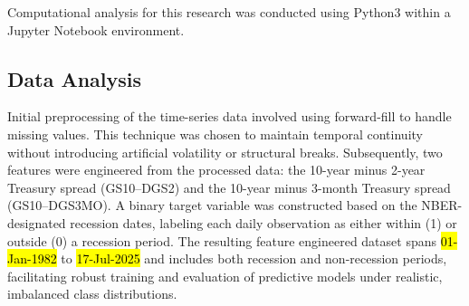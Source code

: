 Computational analysis for this research was conducted using Python3 within a Jupyter Notebook environment.

\subsection{Data Analysis}

Initial preprocessing of the time-series data involved using forward-fill to handle missing values. This technique was chosen to maintain temporal continuity without introducing artificial volatility or structural breaks.
Subsequently, two features were engineered from the processed data: the 10-year minus 2-year Treasury spread (GS10--DGS2) and the 10-year minus 3-month Treasury spread (GS10--DGS3MO). 
A binary target variable was constructed based on the NBER-designated recession dates, labeling each daily observation as either within (1) or outside (0) a recession period. 
The resulting feature engineered dataset spans \hl{01-Jan-1982} to \hl{17-Jul-2025} and includes both recession and non-recession periods, facilitating robust training and evaluation of predictive models under realistic, imbalanced class distributions. \\


